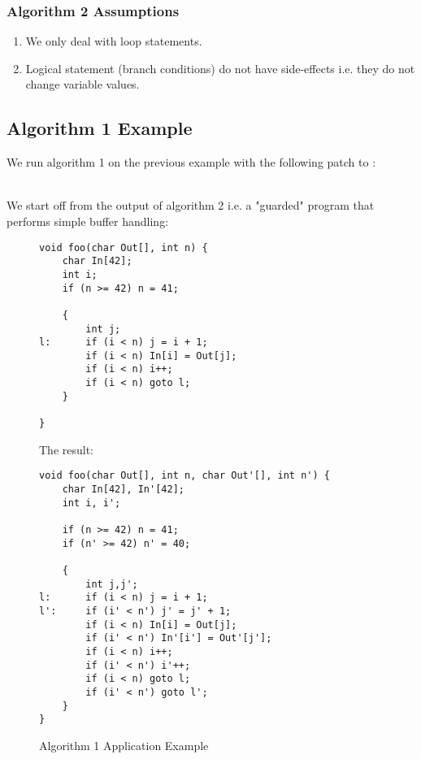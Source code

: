 \subsubsection{Algorithm 2 Assumptions}
\begin{enumerate}
\item We only deal with  loop statements.
\item Logical statement (branch conditions) do not have side-effects i.e. they do not change variable values.
\end{enumerate}


\subsection{Algorithm 1 Example} \label{SubSec:UnionAlgEx}

We run algorithm 1 on the previous example with the following patch to :\\
{\color{Gray}} \\
{\color{Blue}}

We start off from the output of algorithm 2 i.e. a "guarded" program that performs simple buffer handling:
\begin{figure}[H]
\begin{lstlisting}
void foo(char Out[], int n) {
    char In[42];
    int i;
    if (n >= 42) n = 41;

    {
        int j;
l:      if (i < n) j = i + 1;
        if (i < n) In[i] = Out[j];
        if (i < n) i++;
        if (i < n) goto l;
    }

}
\end{lstlisting}
The result:
\begin{lstlisting}
void foo(char Out[], int n, char Out'[], int n') {
    char In[42], In'[42];
    int i, i';

    if (n >= 42) n = 41;
    if (n' >= 42) n' = 40;

    {
        int j,j';
l:      if (i < n) j = i + 1;
l':     if (i' < n') j' = j' + 1;
        if (i < n) In[i] = Out[j];
        if (i' < n') In'[i'] = Out'[j'];
        if (i < n) i++;
        if (i' < n') i'++;
        if (i < n) goto l;
        if (i' < n') goto l';
    }
}
\end{lstlisting} \caption{Algorithm 1 Application Example}
\end{figure}

